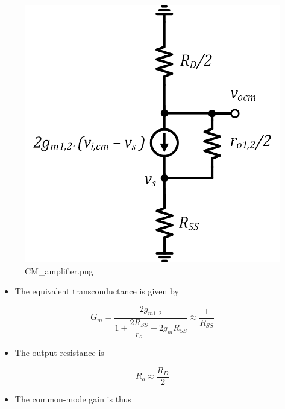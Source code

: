 \documentclass[11pt]{article}
\providecommand{\tightlist}{%
      \setlength{\itemsep}{0pt}\setlength{\parskip}{0pt}}
\begin{document}
    \begin{figure}
\centering
\includegraphics{CM_amplifier.png}
\caption{CM\_amplifier.png}
\end{figure}

    \begin{itemize}
\tightlist
\item
  The equivalent transconductance is given by
\end{itemize}

\begin{equation}
G_m = \dfrac{2g_{m1,2}}{1+\dfrac{2R_{SS}}{r_o} + 2g_m R_{SS}} \approx \dfrac{1}{R_{SS}}
\end{equation}

\begin{itemize}
\tightlist
\item
  The output resistance is
\end{itemize}

\begin{equation}
R_o \approx \dfrac{R_D}{2}
\end{equation}

\begin{itemize}
\tightlist
\item
  The common-mode gain is thus
\end{itemize}
\end{document}
